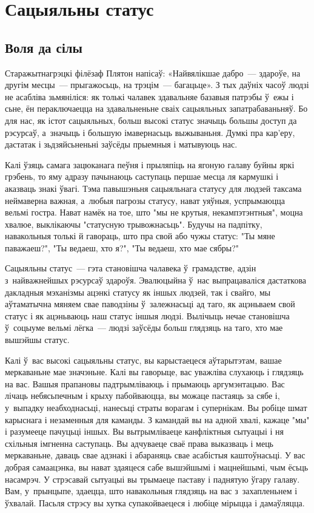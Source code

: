 \chapter{Сацыяльны статус}

\section{Воля да сілы}

Старажытнагрэцкі філёзаф Плятон напісаў: «Найвялікшае дабро~--- здароўе, на другім месцы~--- прыгажосьць, на трэцім~--- багацьце». З тых даўніх часоў людзі не асабліва зьмяніліся: як толькі чалавек здавальняе базавыя патрэбы ў~ежы і сьне, ён пераключаецца на здавальненьне сваіх сацыяльных запатрабаваньняў. Бо для нас, як істот сацыяльных, больш высокі статус значыць большы доступ да рэсурсаў, а~значыць і большую імавернасьць выжываньня. Думкі пра кар'еру, дастатак і зьдзяйсьненьні заўсёды прыемныя і матывуюць нас.

Калі ўзяць самага зацюканага пеўня і прыляпіць на ягоную галаву буйны яркі грэбень, то яму адразу пачынаюць саступаць першае месца ля кармушкі і аказваць знакі ўвагі. Тэма павышэньня сацыяльнага статусу для людзей таксама неймаверна важная, а~любыя пагрозы статусу, нават уяўныя, успрымаюцца вельмі гостра. Нават намёк на тое, што "мы не крутыя, некампэтэнтныя", моцна хвалюе, выклікаючы "статусную трывожнасьць". Будучы на падпітку, навакольныя толькі й гавораць, што пра свой або чужы статус: "Ты мяне паважаеш?", "Ты ведаеш, хто я?", "Ты ведаеш, хто мае сябры?"

Сацыяльны статус~--- гэта становішча чалавека ў~грамадстве, адзін з~найважнейшых рэсурсаў здароўя. Эвалюцыйна ў~нас выпрацаваліся дастаткова дакладныя мэханізмы ацэнкі статусу як іншых людзей, так і свайго, мы аўтаматычна мяняем свае паводзіны ў~залежнасьці ад таго, як ацэньваем свой статус і як ацэньваюць наш статус іншыя людзі. Вылічыць нечае становішча ў~соцыуме вельмі лёгка~--- людзі заўсёды больш глядзяць на таго, хто мае вышэйшы статус.

Калі ў~вас высокі сацыяльны статус, вы карыстаецеся аўтарытэтам, вашае меркаваньне мае значэньне. Калі вы гаворыце, вас уважліва слухаюць і глядзяць на вас. Вашыя прапановы падтрымліваюць і прымаюць аргумэнтацыю. Вас лічаць небясьпечным і крыху пабойваюцца, вы можаце пастаяць за сябе і, у~выпадку неабходнасьці, нанесьці страты ворагам і супернікам. Вы робіце шмат карыснага і незаменныя для каманды. З камандай вы на адной хвалі, кажаце "мы" і разумееце пачуцьці іншых. Вы вытрымліваеце канфліктныя сытуацыі і ня схільныя імгненна саступаць. Вы адчуваеце сваё права выказваць і мець меркаваньне, даваць свае адзнакі і абараняць свае асабістыя каштоўнасьці. У вас добрая самаацэнка, вы нават здаяцеся сабе вышэйшымі і мацнейшымі, чым ёсьць насамрэч. У стрэсавай сытуацыі вы трымаеце паставу і паднятую ўгару галаву. Вам, у~прынцыпе, здаецца, што навакольныя глядзяць на вас з~захапленьнем і ўхвалай. Пасьля стрэсу вы хутка супакойваецеся і любіце мірыцца і дамаўляцца.

